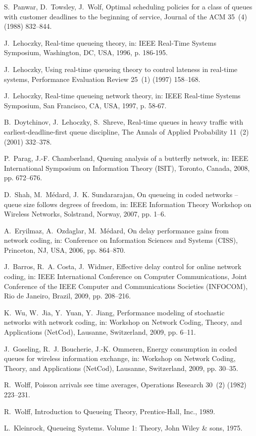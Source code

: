 \documentclass[preprint,12pt]{elsarticle}
\theoremstyle{definition}
\theoremstyle{plain}
\theoremstyle{remark}
\begin{document}
\begin{thebibliography}{100}
S.~Panwar, D.~Towsley, J.~Wolf, Optimal scheduling policies for a class of
  queues with customer deadlines to the beginning of service, Journal of the
  ACM 35~(4) (1988) 832--844.

J.~Lehoczky, Real-time queueing theory, in: IEEE Real-Time Systems Symposium,
  Washington, DC, USA, 1996, p. 186-195.

J.~Lehoczky, Using real-time queueing theory to control lateness in real-time
  systems, Performance Evaluation Review 25~(1) (1997) 158--168.

J.~Lehoczky, Real-time queueing network theory, in: IEEE Real-time Systems
  Symposium, San Francisco, CA, USA, 1997, p. 58-67.

B.~Doytchinov, J.~Lehoczky, S.~Shreve, Real-time queues in heavy traffic with
  earliest-deadline-first queue discipline, The Annals of Applied Probability
  11~(2) (2001) 332--378.

P.~Parag, J.-F. Chamberland, Queuing analysis of a butterfly network, in: IEEE
  International Symposium on Information Theory (ISIT), Toronto, Canada, 2008,
  pp. 672--676.

D.~Shah, M.~M\'{e}dard, J.~K. Sundararajan, On queueing in coded networks --
  queue size follows degrees of freedom, in: IEEE Information Theory Workshop
  on Wireless Networks, Solstrand, Norway, 2007, pp. 1--6.

A.~Eryilmaz, A.~Ozdaglar, M.~M\'{e}dard, On delay performance gains from
  network coding, in: Conference on Information Sciences and Systems (CISS),
  Princeton, NJ, USA, 2006, pp. 864--870.

J.~Barros, R.~A. Costa, J.~Widmer, Effective delay control for online network
  coding, in: IEEE International Conference on Computer Communications, Joint
  Conference of the IEEE Computer and Communications Societies (INFOCOM), Rio
  de Janeiro, Brazil, 2009, pp. 208--216.

K.~Wu, W.~Jia, Y.~Yuan, Y.~Jiang, Performance modeling of stochastic networks
  with network coding, in: Workshop on Network Coding, Theory, and Applications
  (NetCod), Lausanne, Switzerland, 2009, pp. 6--11.

J.~Goseling, R.~J. Boucherie, J.-K. Ommeren, Energy consumption in coded queues
  for wireless information exchange, in: Workshop on Network Coding, Theory,
  and Applications (NetCod), Lausanne, Switzerland, 2009, pp. 30--35.

R.~Wolff, {P}oisson arrivals see time averages, Operations Research 30~(2)
  (1982) 223--231.

R.~Wolff, {I}ntroduction to {Q}ueueing {T}heory, Prentice-Hall, Inc., 1989.

L.~Kleinrock, Queueing Systems. Volume 1: Theory, John Wiley \& sons, 1975.

\end{thebibliography}
\end{document}
